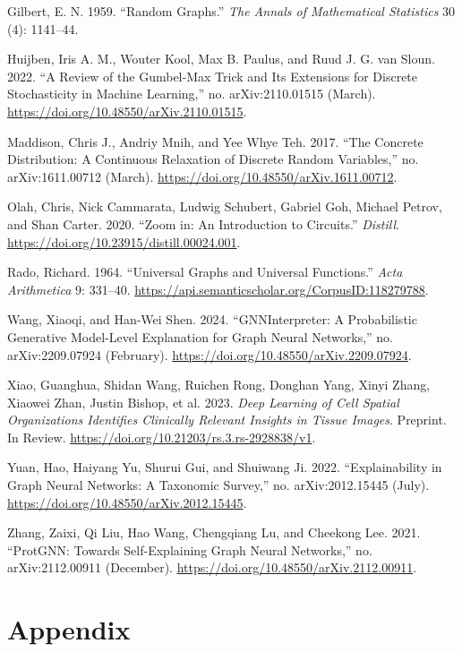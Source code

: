 \documentclass[
  11pt,
  letterpaper,
]{article}
\newlength{\cslhangindent}
\newlength{\cslentryspacingunit} %
\newenvironment{CSLReferences}[2] %
 {%
  \setlength{\parindent}{0pt}
  \ifodd #1
  \let\oldpar\par
  \def\par{\hangindent=\cslhangindent\oldpar}
  \fi
  \setlength{\parskip}{#2\cslentryspacingunit}
 }%
 {}
\begin{document}
\begin{CSLReferences}{1}{0}
\leavevmode{}%
Gilbert, E. N. 1959. {``Random Graphs.''} \emph{The Annals of
Mathematical Statistics} 30 (4): 1141--44.

\leavevmode{}%
Huijben, Iris A. M., Wouter Kool, Max B. Paulus, and Ruud J. G. van
Sloun. 2022. {``A Review of the Gumbel-Max Trick and Its Extensions for
Discrete Stochasticity in Machine Learning,''} no. arXiv:2110.01515
(March). \url{https://doi.org/10.48550/arXiv.2110.01515}.

\leavevmode{}%
Maddison, Chris J., Andriy Mnih, and Yee Whye Teh. 2017. {``The Concrete
Distribution: A Continuous Relaxation of Discrete Random Variables,''}
no. arXiv:1611.00712 (March).
\url{https://doi.org/10.48550/arXiv.1611.00712}.

\leavevmode{}%
Olah, Chris, Nick Cammarata, Ludwig Schubert, Gabriel Goh, Michael
Petrov, and Shan Carter. 2020. {``Zoom in: An Introduction to
Circuits.''} \emph{Distill}.
\url{https://doi.org/10.23915/distill.00024.001}.

\leavevmode{}%
Rado, Richard. 1964. {``Universal Graphs and Universal Functions.''}
\emph{Acta Arithmetica} 9: 331--40.
\url{https://api.semanticscholar.org/CorpusID:118279788}.

\leavevmode{}%
Wang, Xiaoqi, and Han-Wei Shen. 2024. {``GNNInterpreter: A Probabilistic
Generative Model-Level Explanation for Graph Neural Networks,''} no.
arXiv:2209.07924 (February).
\url{https://doi.org/10.48550/arXiv.2209.07924}.

\leavevmode{}%
Xiao, Guanghua, Shidan Wang, Ruichen Rong, Donghan Yang, Xinyi Zhang,
Xiaowei Zhan, Justin Bishop, et al. 2023. \emph{Deep Learning of Cell
Spatial Organizations Identifies Clinically Relevant Insights in Tissue
Images}. Preprint. In Review.
\url{https://doi.org/10.21203/rs.3.rs-2928838/v1}.

\leavevmode{}%
Yuan, Hao, Haiyang Yu, Shurui Gui, and Shuiwang Ji. 2022.
{``Explainability in Graph Neural Networks: A Taxonomic Survey,''} no.
arXiv:2012.15445 (July).
\url{https://doi.org/10.48550/arXiv.2012.15445}.

\leavevmode{}%
Zhang, Zaixi, Qi Liu, Hao Wang, Chengqiang Lu, and Cheekong Lee. 2021.
{``ProtGNN: Towards Self-Explaining Graph Neural Networks,''} no.
arXiv:2112.00911 (December).
\url{https://doi.org/10.48550/arXiv.2112.00911}.

\end{CSLReferences}

\hypertarget{appendix}{%
\section{Appendix}\label{appendix}}
\end{document}
